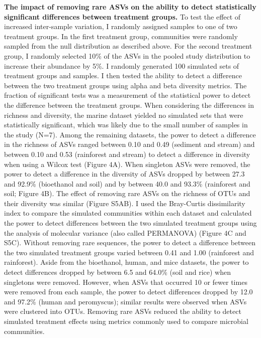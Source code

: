 \documentclass[
]{article}
\begin{document}
\textbf{The impact of removing rare ASVs on the ability to detect
statistically significant differences between treatment groups.} To test
the effect of increased inter-sample variation, I randomly assigned
samples to one of two treatment groups. In the first treatment group,
communities were randomly sampled from the null distribution as
described above. For the second treatment group, I randomly selected
10\% of the ASVs in the pooled study distribution to increase their
abundance by 5\%. I randomly generated 100 simulated sets of treatment
groups and samples. I then tested the ability to detect a difference
between the two treatment groups using alpha and beta diversity metrics.
The fraction of significant tests was a measurement of the statistical
power to detect the difference between the treatment groups. When
considering the differences in richness and diversity, the marine
dataset yielded no simulated sets that were statistically significant,
which was likely due to the small number of samples in the study (N=7).
Among the remaining datasets, the power to detect a difference in the
richness of ASVs ranged between 0.10 and 0.49 (sediment and stream) and
between 0.10 and 0.53 (rainforest and stream) to detect a difference in
diversity when using a Wilcox test (Figure 4A). When singleton ASVs were
removed, the power to detect a difference in the diversity of ASVs
dropped by between 27.3 and 92.9\% (bioethanol and soil) and by between
40.0 and 93.3\% (rainforest and soil; Figure 4B). The effect of removing
rare ASVs on the richness of OTUs and their diversity was similar
(Figure S5AB). I used the Bray-Curtis dissimilarity index to compare the
simulated communities within each dataset and calculated the power to
detect differences between the two simulated treatment groups using the
analysis of molecular variance (also called PERMANOVA) (Figure 4C and
S5C). Without removing rare sequences, the power to detect a difference
between the two simulated treatment groups varied between 0.41 and 1.00
(rainforest and rainforest). Aside from the bioethanol, human, and mice
datasets, the power to detect differences dropped by between 6.5 and
64.0\% (soil and rice) when singletons were removed. However, when ASVs
that occurred 10 or fewer times were removed from each sample, the power
to detect differences dropped by 12.0 and 97.2\% (human and peromyscus);
similar results were observed when ASVs were clustered into OTUs.
Removing rare ASVs reduced the ability to detect simulated treatment
effects using metrics commonly used to compare microbial communities.
\end{document}
